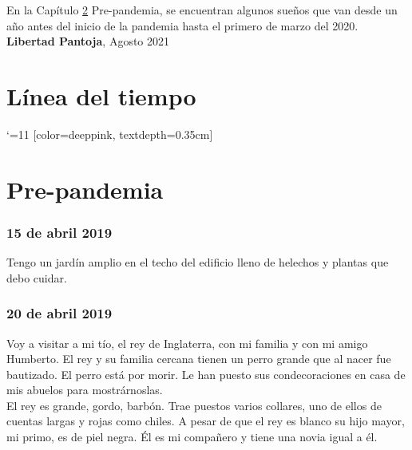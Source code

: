\documentclass[12pt]{book}
\begin{document}
En la Capítulo \ref{prepandemia} Pre-pandemia, se encuentran algunos sueños que van desde un año antes del inicio de la pandemia hasta el primero de marzo del 2020.
\vfill
\hfill {\textbf{Libertad Pantoja}, Agosto 2021}

\chapter{Línea del tiempo}

\catcode `\@=11
\def\chron@selectmonth#1{\ifcase#1\or enero\or febrero\or
marzo\or abril \or mayo \or junio \or julio \or agosto \or
septiembre \or octubre \or noviembre \or diciembre\fi}
\startchronology
[startyear=2019,stopyear=2022, color=lowpink]
[color=deeppink, textdepth=0.35cm]
\stopchronology


\chapter{Pre-pandemia}
\label{prepandemia}
\subsection*{\hfill 15 de abril 2019}

Tengo un jardín amplio en el techo del edificio lleno de helechos y plantas que debo cuidar.

\subsection*{\hfill 20 de abril 2019}

Voy a visitar a mi tío, el rey de Inglaterra, con mi familia y con mi amigo Humberto. El rey y su familia cercana tienen un perro grande que al nacer fue bautizado. El perro está por morir. Le han puesto sus condecoraciones en casa de mis abuelos para mostrárnoslas.
\\
El rey es grande, gordo, barbón. Trae puestos varios collares, uno de ellos de cuentas largas y rojas como chiles. A pesar de que el rey es blanco su hijo mayor, mi primo, es de piel negra. Él es mi compañero y tiene una novia igual a él.
\end{document}
